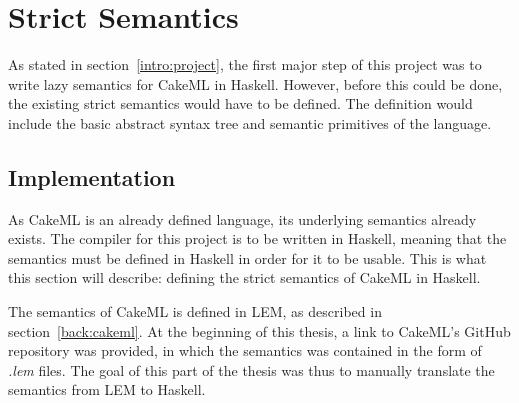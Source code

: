 \chapter{Strict Semantics}
\label{chapter:strict}
As stated in section~\ref{intro:project}, the first major step of this project
was to write lazy semantics for CakeML in Haskell. However, before this could be
done, the existing strict semantics would have to be defined. The definition
would include the basic abstract syntax tree and semantic primitives of the
language.

\section{Implementation}
As CakeML is an already defined language, its underlying semantics already
exists. The compiler for this project is to be written in Haskell, meaning that
the semantics must be defined in Haskell in order for it to be usable. This is
what this section will describe: defining the strict semantics of CakeML in
Haskell.

The semantics of CakeML is defined in LEM, as described in
section~\ref{back:cakeml}. At the beginning of this thesis, a link to CakeML's
GitHub repository was provided, in which the semantics was contained in the form
of \textit{.lem} files. The goal of this part of the thesis was thus to manually
translate the semantics from LEM to Haskell. 
